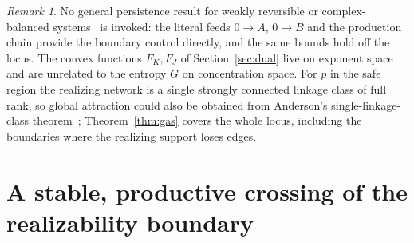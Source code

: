 \documentclass[11pt,a4paper]{article}
\theoremstyle{plain}
\theoremstyle{definition}
\theoremstyle{remark}
\newtheorem{remark}[theorem]{Remark}
\begin{document}
\begin{remark}
No general persistence result for weakly reversible or complex-balanced systems~\cite{Sontag2001,Anderson2011,GopalkrishnanMillerShiu2014,Craciun2015} is invoked: the literal feeds $0\to A$, $0\to B$ and the production chain provide the boundary control directly, and the same bounds hold off the locus. The convex functions $F_K,F_J$ of Section~\ref{sec:dual} live on exponent space and are unrelated to the entropy $G$ on concentration space. For $p$ in the safe region the realizing network is a single strongly connected linkage class of full rank, so global attraction could also be obtained from Anderson's single-linkage-class theorem~\cite{Anderson2011}; Theorem~\ref{thm:gas} covers the whole locus, including the boundaries where the realizing support loses edges.
\end{remark}

\section{A stable, productive crossing of the realizability boundary}\label{sec:crossing}
\end{document}
